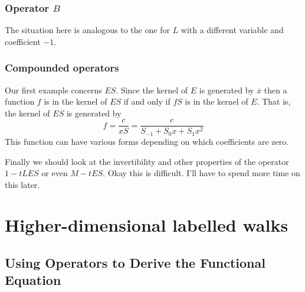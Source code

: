 \documentclass[12pt]{article}
\theoremstyle{definition} \newtheorem{definition}[theorem]{Definition}
\newcommand{\ol}[1]{\overline{#1}}
\begin{document}
\subsubsection{Operator $B$}
The situation here is analogous to the one for $L$ with a different variable and coefficient $-1$.
\subsubsection{Compounded operators}
Our first example concerns $ES$. Since the kernel of $E$ is generated by $\ol{x}$ then a function $f$ is in the kernel of $ES$ if and only if $fS$ is in the kernel of $E$. That is, the kernel of $ES$ is generated by
\[
	f = \frac{c}{xS} = \frac{c}{S_{-1}+S_0 x + S_1 x^2}
\]
This function can have various forms depending on which coefficients are zero.

Finally we should look at the invertibility and other properties of the operator $1-tLES$ or even $M-tES$. Okay this is difficult. I'll have to spend more time on this later.

\section{Higher-dimensional labelled walks}

\subsection{Using Operators to Derive the Functional Equation}
\end{document}
